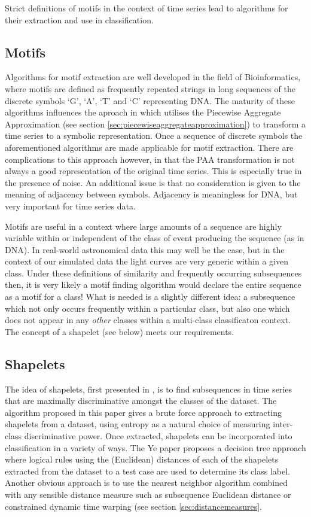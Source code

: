 	Strict definitions of motifs in the context of time series lead to algorithms for their extraction and use in classification.
	
	\subsection{Motifs}
	Algorithms for motif extraction are well developed in the field of Bioinformatics, where motifs are defined as frequently repeated strings in long sequences of the discrete symbols `G', `A', `T' and `C' representing DNA. The maturity of these algorithms influences the aproach in \citet{lin2002finding} which utilises the Piecewise Aggregate Approximation (see section \ref{sec:piecewiseaggregateapproximation}) to transform a time series to a symbolic representation. Once a sequence of discrete symbols the aforementioned algorithms are made applicable for motif extraction. There are complications to this approach however, in that the PAA transformation is not always a good representation of the original time series. This is especially true in the presence of noise. An additional issue is that no consideration is given to the meaning of adjacency between symbols. Adjacency is meaningless for DNA, but very important for time series data.
	
	Motifs are useful in a context where large amounts of a sequence are highly variable within or independent of the class of event producing the sequence (as in DNA). In real-world astronomical data this may well be the case, but in the context of our simulated data the light curves are very generic within a given class. Under these definitions of similarity and frequently occurring subsequences then, it is very likely a motif finding algorithm would declare the entire sequence as a motif for a class! What is needed is a slightly different idea: a subsequence which not only occurs frequently within a particular class, but also one which does not appear in any \emph{other} classes within a multi-class classificaton context. The concept of a shapelet (see below) meets our requirements.

	\subsection{Shapelets}
	The idea of shapelets, first presented in \citet{ye2009time}, is to find subsequences in time series that are maximally discriminative amongst the classes of the dataset. The algorithm proposed in this paper gives a brute force approach to extracting shapelets from a dataset, using entropy as a natural choice of measuring inter-class discriminative power. Once extracted, shapelets can be incorporated into classification in a variety of ways. The Ye paper proposes a decision tree approach where logical rules using the (Euclidean) distances of each of the shapelets extracted from the dataset to a test case are used to determine its class label. Another obvious approach is to use the nearest neighbor algorithm combined with any sensible distance measure such as subsequence Euclidean distance or constrained dynamic time warping (see section \ref{sec:distancemeasures}.
	
